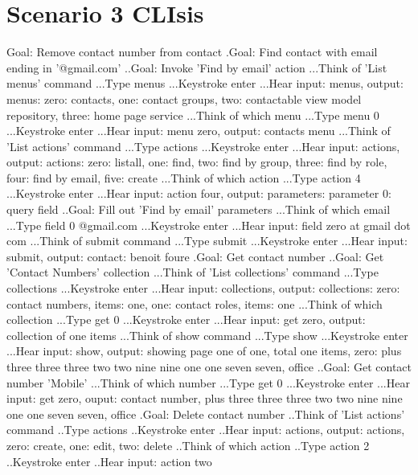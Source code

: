 \section{Scenario 3 CLIsis}
\label{section:scenario3clisis}
\begin{spverbatim}
Goal: Remove contact number from contact
.Goal: Find contact with email ending in '@gmail.com'
..Goal: Invoke 'Find by email' action
...Think of 'List menus' command
...Type menus
...Keystroke enter
...Hear input: menus, output: menus: zero: contacts, one: contact groups, two: contactable view model repository, three: home page service
...Think of which menu
...Type menu 0
...Keystroke enter
...Hear input: menu zero, output: contacts menu
...Think of 'List actions' command
...Type actions
...Keystroke enter
...Hear input: actions, output: actions: zero: listall, one: find, two: find by group, three: find by role, four: find by email, five: create
...Think of which action
...Type action 4
...Keystroke enter
...Hear input: action four, output: parameters: parameter 0: query field
..Goal: Fill out 'Find  by email' parameters
...Think of which email
...Type field 0 @gmail.com
...Keystroke enter
...Hear input: field zero at gmail dot com
...Think of submit command
...Type submit
...Keystroke enter
...Hear input: submit, output: contact: benoit foure
.Goal: Get contact number
..Goal: Get 'Contact Numbers' collection
...Think of 'List collections' command
...Type collections
...Keystroke enter
...Hear input: collections, output: collections: zero: contact numbers, items: one, one: contact roles, items: one
...Think of which collection
...Type get 0
...Keystroke enter
...Hear input: get zero, output: collection of one items
...Think of show command
...Type show
...Keystroke enter
...Hear input: show, output: showing page one of one, total one items, zero: plus three three three two two nine nine one one seven seven, office
..Goal: Get contact number 'Mobile'
...Think of which number
...Type get 0
...Keystroke enter
...Hear input: get zero, ouput: contact number, plus three three three two two nine nine one one seven seven, office
.Goal: Delete contact number
..Think of 'List actions' command
..Type actions
..Keystroke enter
..Hear input: actions, output: actions, zero: create, one: edit, two: delete
..Think of which action
..Type action 2
..Keystroke enter
..Hear input: action two
\end{spverbatim}

